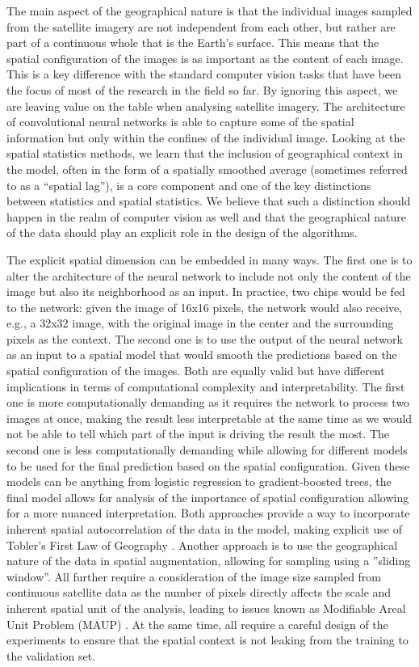 The main aspect of the geographical nature is that the individual images sampled from
the satellite imagery are not independent from each other, but rather are part of a
continuous whole that is the Earth's surface. This means that the spatial configuration
of the images is as important as the content of each image. This is a key difference
with the standard computer vision tasks that have been the focus of most of the research
in the field so far. By ignoring this aspect, we are leaving value on the table when
analysing satellite imagery. The architecture of convolutional neural networks is able
to capture some of the spatial information but only within the confines of the
individual image. Looking at the spatial statistics methods, we learn that the inclusion
of geographical context in the model, often in the form of a spatially smoothed average
(sometimes referred to as a ``spatial lag''), is a core component and one of the key
distinctions between statistics and spatial statistics. We believe that such a
distinction should happen in the realm of computer vision as well and that the
geographical nature of the data should play an explicit role in the design of the
algorithms.

The explicit spatial dimension can be embedded in many ways. The first one is to alter
the architecture of the neural network to include not only the content of the image but
also its neighborhood as an input. In practice, two chips would be fed to the network:
given the image of 16x16 pixels, the network would also receive, e.g., a 32x32 image,
with the original image in the center and the surrounding pixels as the context. The
second one is to use the output of the neural network as an input to a spatial model
that would smooth the predictions based on the spatial configuration of the images. Both
are equally valid but have different implications in terms of computational complexity
and interpretability. The first one is more computationally demanding as it requires the
network to process two images at once, making the result less interpretable at the same
time as we would not be able to tell which part of the input is driving the result the
most. The second one is less computationally demanding while allowing for different
models to be used for the final prediction based on the spatial configuration. Given
these models can be anything from logistic regression to gradient-boosted trees, the
final model allows for analysis of the importance of spatial configuration allowing for
a more nuanced interpretation. Both approaches provide a way to incorporate inherent
spatial autocorrelation of the data in the model, making explicit use of Tobler's First
Law of Geography \citep{tobler1970computer}. Another approach is to use the geographical
nature of the data in spatial augmentation, allowing for sampling using a ''sliding
window''. All further require a consideration of the image size sampled from continuous
satellite data as the number of pixels directly affects the scale and inherent spatial
unit of the analysis, leading to issues known as Modifiable Areal Unit Problem (MAUP)
\citep{openshaw1981modifiable}. At the same time, all require a careful design of the
experiments to ensure that the spatial context is not leaking from the training to the
validation set.

